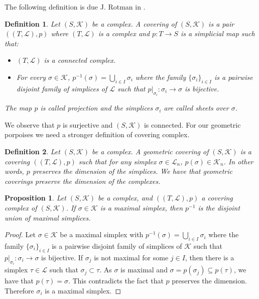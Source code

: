 \documentclass{amsart}
\newtheorem{proposition}{Proposition}[section]
\newtheorem{definition}{Definition}[section]
\begin{document}
The following definition is due J. Rotman in \cite{rotman1973covering}.

\begin{definition}
Let $(S,\mathcal{K})$ be a complex. A covering of $(S,\mathcal{K})$ is a pair $((T,\mathcal{L}),p)$ where $(T,\mathcal{L})$ is a complex and $p\colon T\longrightarrow S$ is a simplicial map such that:
\begin{itemize}
\item $(T,\mathcal{L})$ is a connected complex.
\item For every $\sigma\in\mathcal{K}$, $p^{-1}(\sigma)=\bigcup_{i\in I}\sigma_i$ where the family $\{\sigma_i\}_{i\in I}$ is a pairwise disjoint family of simplices of $\mathcal{L}$ such that $p|_{\sigma_i}\colon \sigma_i\longrightarrow \sigma$ is bijective.
\end{itemize}
The map $p$ is called projection and the simplices $\sigma_i$ are called sheets over $\sigma$.
\end{definition}

We observe that $p$ is surjective and $(S,\mathcal{K})$ is connected. For our geometric porpoises we need a stronger definition of covering complex.

\begin{definition}
Let $(S,\mathcal{K})$ be a complex. A geometric covering of $(S,\mathcal{K})$ is a covering $((T,\mathcal{L}),p)$ such that for any simplex $\sigma\in\mathcal{L}_n$, $p(\sigma)\in\mathcal{K}_n$. In other words, $p$ preserves the dimension of the simplices. We have that geometric coverings preserve the dimension of the complexes.
\end{definition}


\begin{proposition}
Let $(S,\mathcal{K})$ be a complex, and $((T,\mathcal{L}),p)$ a covering complex of $(S,\mathcal{K})$. If $\sigma\in\mathcal{K}$ is a maximal simplex, then $p^{-1}$ is the disjoint union of maximal simplices.
\end{proposition}

\begin{proof}
Let $\sigma\in\mathcal{K}$ be a maximal simplex with  $p^{-1}(\sigma)=\bigcup_{i\in I}\sigma_i$ where the family $\{\sigma_i\}_{i\in I}$ is a pairwise disjoint family of simplices of $\mathcal{K}$ such that $p|_{\sigma_i}\colon \sigma_i\longrightarrow \sigma$ is bijective. If $\sigma_j$ is not maximal for some $j\in I$, then there is a simplex $\tau\in\mathcal{L}$ such that $\sigma_j\subset \tau$. As $\sigma$ is maximal and $\sigma=p(\sigma_j)\subseteq p(\tau)$, we have that $p(\tau)=\sigma$. This contradicts the fact that $p$ preserves the dimension. Therefore $\sigma_i$ is a maximal simplex.
\end{proof}
\end{document}
